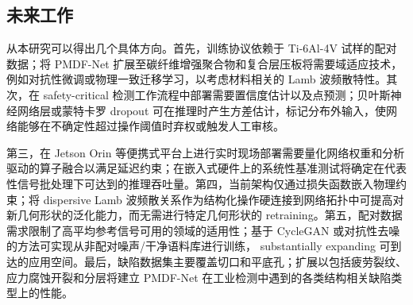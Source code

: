 \subsection{未来工作}
\label{sec:discussion-future}

从本研究可以得出几个具体方向。首先，训练协议依赖于 Ti-6Al-4V 试样的配对数据；将 PMDF-Net 扩展至碳纤维增强聚合物和复合层压板将需要域适应技术，例如对抗性微调或物理一致迁移学习，以考虑材料相关的 Lamb 波频散特性。其次，在 safety-critical 检测工作流程中部署需要置信度估计以及点预测；贝叶斯神经网络层或蒙特卡罗 dropout 可在推理时产生方差估计，标记分布外输入，使网络能够在不确定性超过操作阈值时弃权或触发人工审核。

第三，在 Jetson Orin 等便携式平台上进行实时现场部署需要量化网络权重和分析驱动的算子融合以满足延迟约束；在嵌入式硬件上的系统性基准测试将确定在代表性信号批处理下可达到的推理吞吐量。第四，当前架构仅通过损失函数嵌入物理约束；将 dispersive Lamb 波频散关系作为结构化操作硬连接到网络拓扑中可提高对新几何形状的泛化能力，而无需进行特定几何形状的 retraining。第五，配对数据需求限制了高平均参考信号可用的领域的适用性；基于 CycleGAN 或对抗性去噪的方法可实现从非配对噪声/干净语料库进行训练， substantially expanding 可到达的应用空间。最后，缺陷数据集主要覆盖切口和平底孔；扩展以包括疲劳裂纹、应力腐蚀开裂和分层将建立 PMDF-Net 在工业检测中遇到的各类结构相关缺陷类型上的性能。
